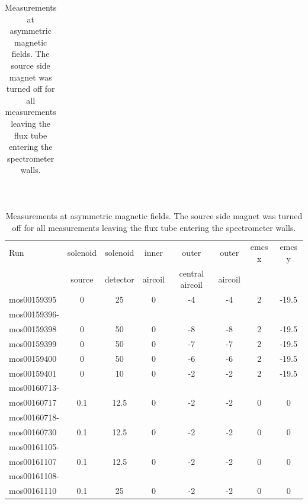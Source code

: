   \begin{table}
	\centering
		\begin{tabular}{c}
		\end{tabular}\\
		\begin{tabular}{|l|ccccccc|}
			\hline
			\centering
			
			Run &  solenoid &solenoid &inner & outer &outer &emcs x	&emcs y\\
			& 	source	& detector & aircoil & central aircoil & aircoil& &\\
			\hline
			mos00159395& 0&	25&	0&	-4&	-4&	2&	-19.5\\
			\hline
			mos00159396-&&&&&&&\\
			mos00159398 & 0 & 50& 0 & -8 & -8 & 2 & -19.5\\
			mos00159399 & 0 & 50& 0 & -7 & -7 & 2 & -19.5\\
			\hline
			mos00159400 & 0 & 50& 0 & -6 & -6 & 2 & -19.5\\
			\hline
			mos00159401 & 0 & 10& 0 & -2 & -2 & 2 & -19.5\\
			\hline
			mos00160713-&&&&&&&\\
			mos00160717& 0.1 & 12.5 & 0 & -2 & -2 & 0 & 0\\
			\hline
			mos00160718-&&&&&&&\\
			mos00160730 & 0.1 & 12.5 & 0 & -2 & -2 & 0 & 0\\
			\hline
			mos00161105-&&&&&&&\\
			mos00161107 & 0.1 & 12.5 & 0 & -2 & -2 & 0 & 0\\
			\hline
			mos00161108-&&&&&&&\\
			mos00161110 & 0.1 & 25 & 0 & -2 & -2 & 0 & 0\\
			\hline
		\end{tabular}
		\caption[Asymmetric magnetic field measurements]{Measurements at asymmetric magnetic fields. The source side magnet was turned off for all measurements leaving the flux tube entering the spectrometer walls.}
		\label{tab:analysis:asymmetricMagneticFields}
	\end{table}
